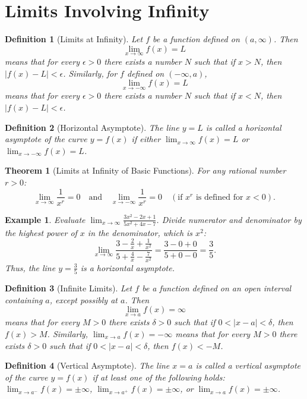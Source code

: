\documentclass[11pt,a4paper]{article}
\newtheorem{example}{Example}
\newtheorem{theorem}{Theorem}
\newtheorem{definition}{Definition}
\begin{document}
\section{Limits Involving Infinity}
\begin{definition}[Limits at Infinity]
Let $f$ be a function defined on $(a, \infty)$. Then
\[
\lim_{x \to \infty} f(x) = L
\]
means that for every $\epsilon > 0$ there exists a number $N$ such that if $x > N$, then $|f(x) - L| < \epsilon$.
Similarly, for $f$ defined on $(-\infty, a)$,
\[
\lim_{x \to -\infty} f(x) = L
\]
means that for every $\epsilon > 0$ there exists a number $N$ such that if $x < N$, then $|f(x) - L| < \epsilon$.
\end{definition}
\begin{definition}[Horizontal Asymptote]
The line $y = L$ is called a \textit{horizontal asymptote} of the curve $y = f(x)$ if either $\displaystyle \lim_{x \to \infty} f(x) = L$ or $\displaystyle \lim_{x \to -\infty} f(x) = L$.
\end{definition}
\begin{theorem}[Limits at Infinity of Basic Functions]
For any rational number $r > 0$:
\[
\lim_{x \to \infty} \frac{1}{x^r} = 0 \quad \text{and} \quad \lim_{x \to -\infty} \frac{1}{x^r} = 0 \quad (\text{if } x^r \text{ is defined for } x < 0).
\]
\end{theorem}
\begin{example}
Evaluate $\displaystyle \lim_{x \to \infty} \frac{3x^2 - 2x + 1}{5x^2 + 4x - 7}$.
Divide numerator and denominator by the highest power of $x$ in the denominator, which is $x^2$:
\[
\lim_{x \to \infty} \frac{3 - \frac{2}{x} + \frac{1}{x^2}}{5 + \frac{4}{x} - \frac{7}{x^2}} = \frac{3 - 0 + 0}{5 + 0 - 0} = \frac{3}{5}.
\]
Thus, the line $y = \frac{3}{5}$ is a horizontal asymptote.
\end{example}
\begin{definition}[Infinite Limits]
Let $f$ be a function defined on an open interval containing $a$, except possibly at $a$. Then
\[
\lim_{x \to a} f(x) = \infty
\]
means that for every $M > 0$ there exists $\delta > 0$ such that if $0 < |x - a| < \delta$, then $f(x) > M$.
Similarly, $\displaystyle \lim_{x \to a} f(x) = -\infty$ means that for every $M > 0$ there exists $\delta > 0$ such that if $0 < |x - a| < \delta$, then $f(x) < -M$.
\end{definition}
\begin{definition}[Vertical Asymptote]
The line $x = a$ is called a \textit{vertical asymptote} of the curve $y = f(x)$ if at least one of the following holds: $\lim_{x \to a^-} f(x) = \pm \infty$, $\lim_{x \to a^+} f(x) = \pm \infty$, or $\lim_{x \to a} f(x) = \pm \infty$.
\end{definition}
\end{document}
